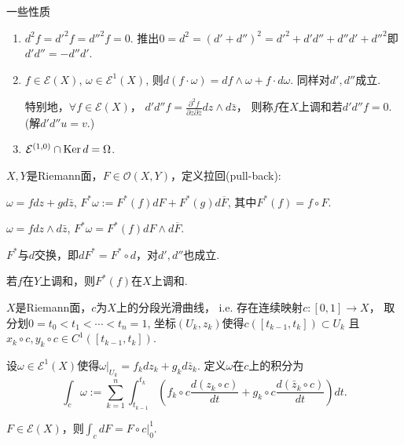 \begin{proposition} 一些性质
	\begin{enumerate}
		\item[1.] $d^2f=d'^2f=d''^2f=0$. 推出$0=d^2=(d'+d'')^2=d'^2+d'd''+d''d'+d''^2$即$d'd''=-d''d'$.
		\item[2.] $f\in \mathcal{E}(X)$, $\omega\in \mathcal{E}^1(X)$, 
        则$d(f\cdot \omega)=df\wedge \omega+f\cdot d\omega$. 同样对$d',d''$成立.

		特别地，$\forall f\in \mathcal{E}(X)$，
        $d'd''f=\frac{\partial^2 f}{\partial z\partial \bar{z}}dz\wedge d\bar{z}$，
        则称$f$在$X$上调和若$d'd''f=0$. (解$d'd''u=v$.)
		\item[3.] $\mathcal{E}^{(1,0)}\cap \operatorname{Ker} d=\Omega$.
	\end{enumerate}
\end{proposition}

\begin{definition}
    $X, Y$是Riemann面，$F\in \mathcal{O}(X,Y)$，定义拉回(pull-back):

	$\omega=fdz+gd\bar{z}$, $F^*\omega:=F^*(f)dF+F^*(g)d\overline{F}$, 
    其中$F^*(f)=f\circ F$.

	$\omega=fdz\wedge d\bar{z}$, $F^*\omega=F^*(f)dF\wedge d\overline{F}$.
\end{definition}
		
\begin{proposition}
	$F^*$与$d$交换，即$dF^*=F^*\circ d$，对$d', d''$也成立.
\end{proposition}
		
\begin{corollary}
	若$f$在$Y$上调和，则$F^*(f)$在$X$上调和.
\end{corollary}

\begin{definition}[积分]
	$X$是Riemann面，$c$为$X$上的分段光滑曲线，
    i.e. 存在连续映射$c\colon [0,1]\rightarrow X$，
    取分划$0=t_0<t_1<\cdots<t_n=1$, 坐标$(U_k,z_k)$使得$c([t_{k-1},t_k])\subset U_k$
    且$x_k\circ c, y_k\circ c\in C^1([t_{k-1},t_k])$.

	设$\omega\in \mathcal{E}^1(X)$使得$\omega|_{U_k}=f_kdz_k+g_kd\bar{z}_k$. 
    定义$\omega$在$c$上的积分为
	$$\int_c \omega:=\sum\limits_{k=1}^n 
    \int_{t_{k-1}}^{t_k} \left(f_k\circ c \frac{d(z_k\circ c)}{dt}
    +g_k\circ c \frac{d(\bar{z}_k\circ c)}{dt}\right) dt.$$
\end{definition}

\begin{theorem}
	$F\in \mathcal{E}(X)$，则$\int_c dF=F\circ c|_0^1$.
\end{theorem}
		
